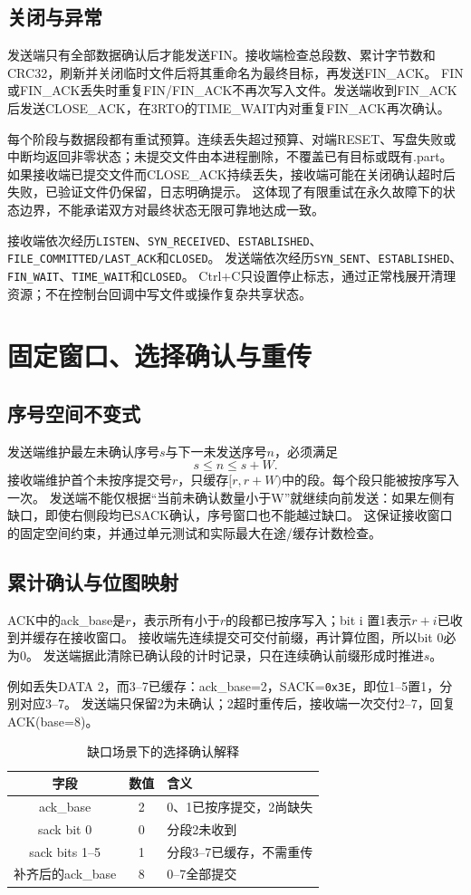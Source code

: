 \documentclass[UTF8,notitlepage,11pt]{ctexart}
\newcommand{\src}[1]{\nolinkurl{#1}}
\begin{document}
\subsection{关闭与异常}
发送端只有全部数据确认后才能发送FIN。接收端检查总段数、累计字节数和CRC32，刷新并关闭临时文件后将其重命名为最终目标，再发送FIN\_ACK。
FIN或FIN\_ACK丢失时重复FIN/FIN\_ACK不再次写入文件。发送端收到FIN\_ACK后发送CLOSE\_ACK，在3RTO的TIME\_WAIT内对重复FIN\_ACK再次确认。

每个阶段与数据段都有重试预算。连续丢失超过预算、对端RESET、写盘失败或中断均返回非零状态；未提交文件由本进程删除，不覆盖已有目标或既有.part。
如果接收端已提交文件而CLOSE\_ACK持续丢失，接收端可能在关闭确认超时后失败，已验证文件仍保留，日志明确提示。
这体现了有限重试在永久故障下的状态边界，不能承诺双方对最终状态无限可靠地达成一致。

接收端依次经历\src{LISTEN}、\src{SYN_RECEIVED}、\src{ESTABLISHED}、\src{FILE_COMMITTED/LAST_ACK}和\src{CLOSED}。
发送端依次经历\src{SYN_SENT}、\src{ESTABLISHED}、\src{FIN_WAIT}、\src{TIME_WAIT}和\src{CLOSED}。
Ctrl+C只设置停止标志，通过正常栈展开清理资源；不在控制台回调中写文件或操作复杂共享状态。

\section{固定窗口、选择确认与重传}\label{sec:sr}
\subsection{序号空间不变式}
发送端维护最左未确认序号$s$与下一未发送序号$n$，必须满足
\[
s\le n\le s+W.
\]
接收端维护首个未按序提交号$r$，只缓存$[r,r+W)$中的段。每个段只能被按序写入一次。
发送端不能仅根据“当前未确认数量小于W”就继续向前发送：如果左侧有缺口，即使右侧段均已SACK确认，序号窗口也不能越过缺口。
这保证接收窗口的固定空间约束，并通过单元测试和实际最大在途/缓存计数检查。

\subsection{累计确认与位图映射}
ACK中的ack\_base是$r$，表示所有小于$r$的段都已按序写入；bit i 置1表示$r+i$已收到并缓存在接收窗口。
接收端先连续提交可交付前缀，再计算位图，所以bit 0必为0。
发送端据此清除已确认段的计时记录，只在连续确认前缀形成时推进$s$。

例如丢失DATA 2，而3--7已缓存：ack\_base=2，SACK=\src{0x3E}，即位1--5置1，分别对应3--7。
发送端只保留2为未确认；2超时重传后，接收端一次交付2--7，回复ACK(base=8)。
\begin{table}[H]\centering\small
\caption{缺口场景下的选择确认解释}
\begin{tabular}{ccl}\toprule
字段 & 数值 & 含义\\\midrule
ack\_base & 2 & 0、1已按序提交，2尚缺失\\
sack bit 0 & 0 & 分段2未收到\\
sack bits 1--5 & 1 & 分段3--7已缓存，不需重传\\
补齐后的ack\_base & 8 & 0--7全部提交\\\bottomrule
\end{tabular}\end{table}
\end{document}
